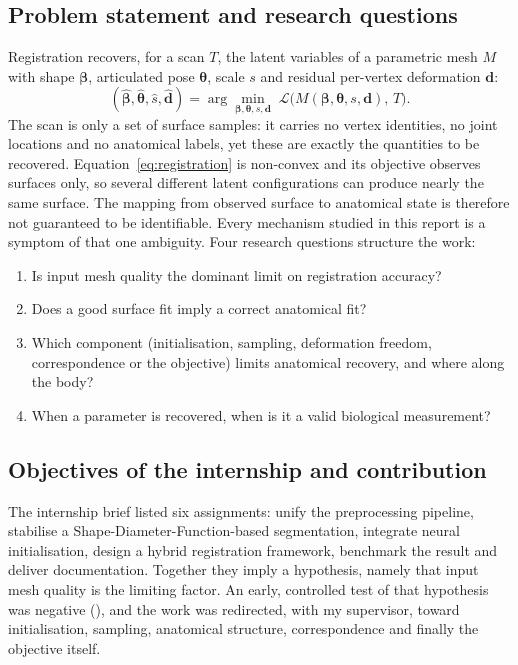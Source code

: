\subsection{Problem statement and research questions}
\label{sec:problem}

Registration recovers, for a scan $T$, the latent variables of a parametric
mesh $M$ with shape $\bm\beta$, articulated pose $\bm\theta$, scale $s$ and
residual per-vertex deformation $\mathbf d$:
\begin{equation}
(\hat{\bm\beta},\hat{\bm\theta},\hat s,\hat{\mathbf d})
 =\arg\min_{\bm\beta,\bm\theta,s,\mathbf d}\;
 \mathcal{L}\big(M(\bm\beta,\bm\theta,s,\mathbf d),\,T\big).
\label{eq:registration}
\end{equation}
The scan is only a set of surface samples: it carries no vertex identities, no
joint locations and no anatomical labels, yet these are exactly the
quantities to be recovered. Equation~\eqref{eq:registration} is non-convex and
its objective observes surfaces only, so several different latent
configurations can produce nearly the same surface. The mapping from observed
surface to anatomical state is therefore not guaranteed to be identifiable.
Every mechanism studied in this report is a symptom of that one ambiguity.
Four research questions structure the work:
\begin{enumerate}[label=\textbf{RQ\arabic*.}]
\item Is input mesh quality the dominant limit on registration accuracy?
\item Does a good surface fit imply a correct anatomical fit?
\item Which component (initialisation, sampling, deformation freedom,
correspondence or the objective) limits anatomical recovery, and where along
the body?
\item When a parameter is recovered, when is it a valid biological
measurement?
\end{enumerate}

\subsection{Objectives of the internship and contribution}

The internship brief listed six assignments: unify the preprocessing pipeline,
stabilise a Shape-Diameter-Function-based segmentation, integrate neural
initialisation, design a hybrid registration framework, benchmark the result
and deliver documentation. Together they imply a hypothesis, namely that input
mesh quality is the limiting factor. An early, controlled test of that
hypothesis was negative (), and the work was redirected, with my
supervisor, toward initialisation, sampling, anatomical structure,
correspondence and finally the objective itself.

